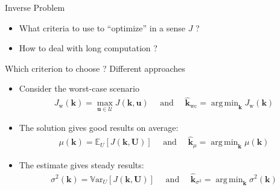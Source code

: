 \documentclass{beamer}
\newlength{\thirdcolwid}
\newcommand{\Ex}{\mathbb{E}}
\newcommand{\Var}{\mathbb{V}\mathrm{ar}}
\DeclareMathOperator*{\argmin}{arg\,min}
\newcommand{\kest}{\hat{\bm{k}}}
\begin{document}
\begin{frame}[t]
\begin{columns}[t]
\begin{column}{\thirdcolwid}
\begin{block}{Inverse Problem}
\begin{itemize}
\item What criteria to use to ``optimize'' in a sense $J$ ?
\item How to deal with long computation ?
\end{itemize}
\end{block}
\begin{block}{Which criterion to choose ? \cite{lehman_designing_2004,janusevskis_simultaneous_2010}}
  Different approaches
  \begin{itemize}
  \item Consider the \alert{worst-case scenario} \cite{wald_statistical_1945}
    \begin{align*}
      J_{\mathrm{w}}(\bm{k}) = \max_{\bm{u}\in\mathcal{U}} J(\bm{k},\bm{u}) \quad \text{ and } \quad \kest_{\mathrm{wc}} = \argmin_{\bm{k}} J_{\mathrm{w}}(\bm{k})
    \end{align*}
    \item The solution gives \alert{good results on average}:
  \begin{align*}
    \mu(\bm{k}) = \Ex_U[J(\bm{k},\bm{U})]\quad \text{ and }  \quad  \kest_{\mu} = \argmin_{\bm{k}}  \mu(\bm{k})
  \end{align*}

 \item The estimate gives \alert{steady results}:
  \begin{align*}
    \sigma^2(\bm{k}) = \Var_U[J(\bm{k},\bm{U})] \quad\text{ and } \quad \kest_{\sigma^2} = \argmin_{\bm{k}} \sigma^2(\bm{k})
  \end{align*}

 

\end{itemize}
\end{block}
\end{column}
\end{columns}
\end{frame}
\end{document}

